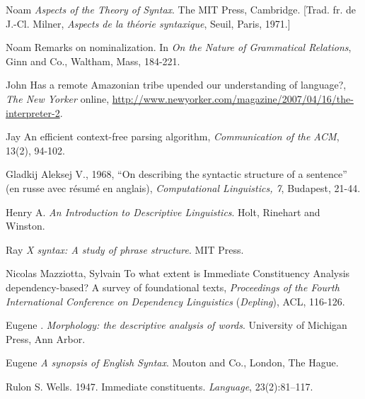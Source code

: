 {    Noam \citet{Chomsky1965} \textit{Aspects of the Theory of Syntax}. The MIT Press, Cambridge. [Trad. fr. de J.-Cl. Milner, \textit{Aspects de la théorie syntaxique}, Seuil, Paris, 1971.]

    Noam \citet{Chomsky1970} Remarks on nominalization. In \textit{On the Nature of Grammatical Relations}, Ginn and Co., Waltham, Mass, 184-221.

    John \citet{Colapinto2007} Has a remote Amazonian tribe upended our understanding of language?, \textit{The New Yorker} online, \url{http://www.newyorker.com/magazine/2007/04/16/the-interpreter-2}.

    Jay \citet{Earley1970} An efficient context-free parsing algorithm, \textit{Communication of the ACM}, 13(2), 94-102.

    Gladkij Aleksej V., 1968, “On describing the syntactic structure of a sentence” (en russe avec résumé en anglais), \textit{Computational Linguistics, 7}, Budapest, 21-44.

    Henry A. \citet{Gleason1955} \textit{An Introduction to Descriptive Linguistics}. Holt, Rinehart and Winston.

    Ray \citet{Jackendoff1977} \textit{X syntax: A study of phrase structure}. MIT Press.

    Nicolas Mazziotta, Sylvain \citet{Kahane2017} To what extent is Immediate Constituency Analysis dependency-based? A survey of foundational texts, \textit{Proceedings of the Fourth International Conference on Dependency Linguistics} (\textit{Depling}), ACL, 116-126.

    Eugene \citet{Nida1943}. \textit{Morphology: the descriptive analysis of words}. University of Michigan Press, Ann Arbor.

    Eugene \citet{Nida1966} \textit{A synopsis of English Syntax}. Mouton and Co., London, The Hague.

    Rulon S. Wells. 1947. Immediate constituents. \textit{Language}, 23(2):81–117.
}

